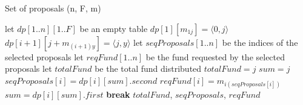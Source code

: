 \documentclass[12pt]{article}
\begin{document}
\begin{algorithm}[H]
     \caption{Set of proposals (n, F, m)}
     \begin{algorithmic}[1]
          \State let \(dp[1..n][1..F]\) be an empty table 
               \State \(dp[1][m_{1j}] = \langle 0,j \rangle\) 
          \EndFor
                                   \State \(dp[i+1][j+m_{(i+1)y}] = \langle j,y \rangle\)
                              \EndIf
                         \EndFor
                    \EndIf
               \EndFor
          \EndFor
          \State let \(seqProposals[1..n]\) be the indices of the selected proposals
          \State let \(reqFund[1..n]\) be the fund requested by the selected proposals
          \State let \(totalFund\) be the total fund distributed
                
                    \State \(totalFund = j\)
                    \State \(sum = j\)
                     
                         \State \(seqProposals[i] = dp[i][sum].second\)
                         \State \(reqFund[i] = m_{i(seqProposals[i])}\)
                         \State \(sum = dp[i][sum].first\)
                    \EndFor
                    \State \textbf{break}
               \EndIf
          \EndFor
          \State \Return \(totalFund\), \(seqProposals\), \(reqFund\)
     \end{algorithmic}
\end{algorithm}
\end{document}
